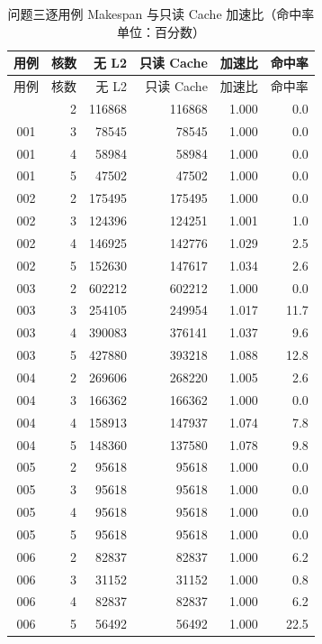 \scriptsize
\setlength{\tabcolsep}{2.5pt}
\renewcommand{\arraystretch}{0.95}
\begin{longtable}{|c|r|r|r|r|r|}
\caption{问题三逐用例 Makespan 与只读 Cache 加速比（命中率单位：百分数）}\label{tab:q3_time}\\
\hline
用例 & 核数 & 无 L2 & 只读 Cache & 加速比 & 命中率 \\
\hline
\endfirsthead
\hline
用例 & 核数 & 无 L2 & 只读 Cache & 加速比 & 命中率 \\
\hline
\endhead
\hline
\endfoot
001 & 2 & 116868 & 116868 & 1.000 & 0.0 \\
\hline
001 & 3 & 78545 & 78545 & 1.000 & 0.0 \\
\hline
001 & 4 & 58984 & 58984 & 1.000 & 0.0 \\
\hline
001 & 5 & 47502 & 47502 & 1.000 & 0.0 \\
\hline
002 & 2 & 175495 & 175495 & 1.000 & 0.0 \\
\hline
002 & 3 & 124396 & 124251 & 1.001 & 1.0 \\
\hline
002 & 4 & 146925 & 142776 & 1.029 & 2.5 \\
\hline
002 & 5 & 152630 & 147617 & 1.034 & 2.6 \\
\hline
003 & 2 & 602212 & 602212 & 1.000 & 0.0 \\
\hline
003 & 3 & 254105 & 249954 & 1.017 & 11.7 \\
\hline
003 & 4 & 390083 & 376141 & 1.037 & 9.6 \\
\hline
003 & 5 & 427880 & 393218 & 1.088 & 12.8 \\
\hline
004 & 2 & 269606 & 268220 & 1.005 & 2.6 \\
\hline
004 & 3 & 166362 & 166362 & 1.000 & 0.0 \\
\hline
004 & 4 & 158913 & 147937 & 1.074 & 7.8 \\
\hline
004 & 5 & 148360 & 137580 & 1.078 & 9.8 \\
\hline
005 & 2 & 95618 & 95618 & 1.000 & 0.0 \\
\hline
005 & 3 & 95618 & 95618 & 1.000 & 0.0 \\
\hline
005 & 4 & 95618 & 95618 & 1.000 & 0.0 \\
\hline
005 & 5 & 95618 & 95618 & 1.000 & 0.0 \\
\hline
006 & 2 & 82837 & 82837 & 1.000 & 6.2 \\
\hline
006 & 3 & 31152 & 31152 & 1.000 & 0.8 \\
\hline
006 & 4 & 82837 & 82837 & 1.000 & 6.2 \\
\hline
006 & 5 & 56492 & 56492 & 1.000 & 22.5 \\

\end{longtable}
